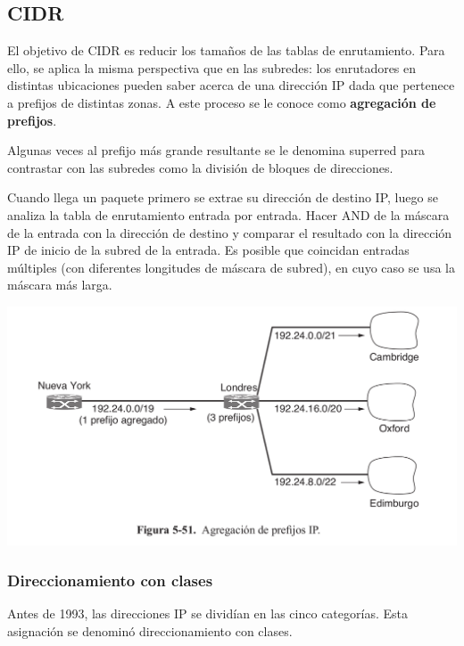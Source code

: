 \documentclass[10pt,a4paper]{report}
\begin{document}
	\subsection{CIDR}

	El objetivo de CIDR es reducir los tamaños de las tablas de enrutamiento. Para ello, se aplica la misma perspectiva que en las subredes: los enrutadores en distintas 			ubicaciones pueden saber acerca de una dirección IP dada que pertenece a prefijos de distintas zonas. A este proceso se le conoce como \textbf{agregación de prefijos}. 		\par Algunas veces al prefijo más grande resultante se le denomina superred para contrastar con las subredes como la división de bloques
de direcciones.
	\par Cuando llega un paquete primero se extrae su dirección de destino IP, luego se analiza la tabla de enrutamiento entrada por entrada. Hacer AND de la máscara de la entrada con la dirección de destino y comparar el resultado con la dirección IP de inicio de la subred de la entrada. Es posible que coincidan entradas múltiples (con diferentes longitudes de máscara de subred), en cuyo caso se usa la máscara más larga.
	
	\begin{center}
		\includegraphics[scale=0.3]{./imagenes/agregacionPrefijosIP.png} 
	\end{center}	
	
	\subsubsection{Direccionamiento con clases}
	Antes de 1993, las direcciones IP se dividían en las cinco categorías. Esta asignación se denominó direccionamiento con clases.	
	
\end{document}

